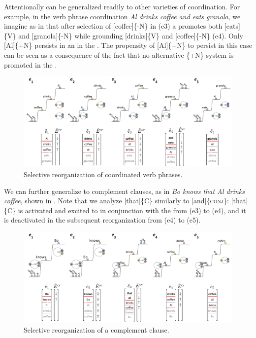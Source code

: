   Attentionally  can be generalized readily to other varieties of coordination. For example, in the verb phrase coordination \textit{Al drinks coffee and eats granola}, we imagine as in {} that after selection of [coffee]\{-N\} in (e3) a  promotes both [eats]\{V\} and [granola]\{-N\} while grounding [drinks]\{V\} and [coffee]\{-N\} (e4). Only [Al]\{+N\} persists in an  in the . The propensity of [Al]\{+N\} to persist in this case can be seen as a consequence of the fact that no alternative \{+N\} system is promoted in the .

  
\begin{figure}
\includegraphics[width=\textwidth]{figures/Tilsen-img100.png}
\caption{Selective reorganization of coordinated verb phrases.}
\label{fig:4:50}
\end{figure}
 

  We can further generalize  to complement clauses, as in \textit{Bo knows that Al drinks coffee}, shown in {}. Note that we analyze [that]\{C\} similarly to [and]\{\textsc{conj}\}: [that]\{C\} is activated and excited to  in conjunction with the  from (e3) to (e4), and it is deactivated in the subsequent reorganization from (e4) to (e5). 

  
\begin{figure}
\includegraphics[width=\textwidth]{figures/Tilsen-img101.png}
\caption{Selective reorganization of a complement clause.}
\label{fig:4:51}
\end{figure}
 

